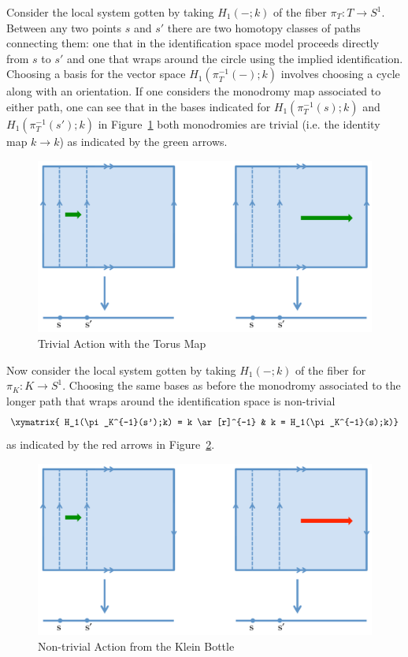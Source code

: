 Consider the local system gotten by taking $H_1(-;k)$ of the fiber $\pi_T:T\to S^1$. Between any two points $s$ and $s'$ there are two homotopy classes of paths connecting them: one that in the identification space model proceeds directly from $s$ to $s'$ and one that wraps around the circle using the implied identification. Choosing a basis for the vector space $H_1(\pi_T^{-1}(-);k)$ involves choosing a cycle along with an orientation. If one considers the monodromy map associated to either path, one can see that in the bases indicated for $H_1(\pi_T^{-1}(s);k)$ and $H_1(\pi_T^{-1}(s');k)$ in Figure~\ref{fig:torus_action} both monodromies are trivial (i.e. the identity map $k\to k$) as indicated by the green arrows.

\begin{figure}
\centering
\includegraphics[width=\textwidth]{torus_action.pdf}
\caption{Trivial Action with the Torus Map}
\label{fig:torus_action}
\end{figure}

Now consider the local system gotten by taking $H_1(-;k)$ of the fiber for $\pi_K:K\to S^1$. Choosing the same bases as before the monodromy associated to the longer path that wraps around the identification space is non-trivial
\[
\xymatrix{ H_1(\pi_K^{-1}(s');k) = k \ar[r]^{-1} & k = H_1(\pi_K^{-1}(s);k)}
\]
as indicated by the red arrows in Figure~\ref{fig:klein_action}.

\begin{figure}
\centering
\includegraphics[width=\textwidth]{klein_action.pdf}
\caption{Non-trivial Action from the Klein Bottle}
\label{fig:klein_action}
\end{figure}

